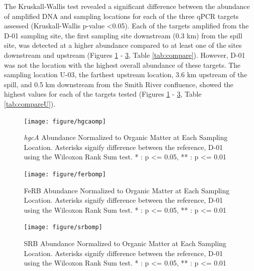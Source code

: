 \documentclass[ms, hidelinks]{uncgdissertationexp}
\theoremstyle{plain}
\theoremstyle{definition}
\theoremstyle{remark}
\begin{document}
The Kruskall-Wallis test revealed a significant difference between the abundance of amplified DNA and sampling locations for each of the three qPCR targets assessed (Kruskall-Wallis p-value \textless0.05). Each of the targets amplified from the D-01 sampling site, the first sampling site downstream (0.3 km) from the spill site, was detected at a higher abundance compared to at least one of the sites downstream and upstream (Figures \ref{fig:hgcaomp} - \ref{fig:srbomp}, Table \ref{tab:compare}). However, D-01 was not the location with the highest overall abundance of these targets. The sampling location U-03, the farthest upstream location, 3.6 km upstream of the spill, and 0.5 km downstream from the Smith River confluence, showed the highest values for each of the targets tested (Figures \ref{fig:hgcaomp} - \ref{fig:srbomp}, Table \ref{tab:compareU}).
\begin{figure}[htbp]
  \texttt{[image: figure/hgcaomp]}
   \caption[\textit{hgcA} Abundance Normalized to Organic Matter at Each Sampling Location.]{\textit{hgcA} Abundance Normalized to Organic Matter at Each Sampling Location. Asterisks signify difference between the reference, D-01 using the Wilcoxon Rank Sum test. * : p <= 0.05, ** : p <= 0.01}\label{fig:hgcaomp}
\end{figure}
\begin{figure}[htbp]
  \texttt{[image: figure/ferbomp]}
   \caption[FeRB Abundance Normalized to Organic Matter at Each Sampling Location.]{FeRB Abundance Normalized to Organic Matter at Each Sampling Location. Asterisks signify difference between the reference, D-01 using the Wilcoxon Rank Sum test. * : p <= 0.05, ** : p <= 0.01}\label{fig:ferbomp}
\end{figure}
\begin{figure}[htbp]
  \texttt{[image: figure/srbomp]}
   \caption[SRB Abundance Normalized to Organic Matter at Each Sampling Location.]{SRB Abundance Normalized to Organic Matter at Each Sampling Location. Asterisks signify difference between the reference, D-01 using the Wilcoxon Rank Sum test. * : p <= 0.05, ** : p <= 0.01}\label{fig:srbomp}
\end{figure}
\end{document}
